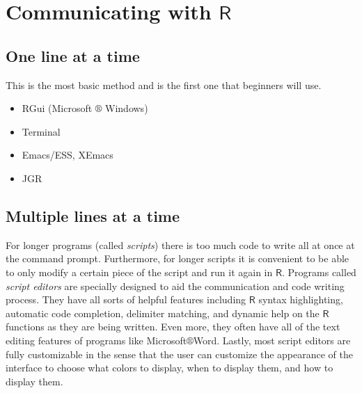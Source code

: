 \section{Communicating with \(\mathsf{R}\)}
\label{sec-2-2}

\subsection{One line at a time}
\label{sec-2-2-1}

This is the most basic method and is the first one that beginners will use.
\begin{itemize}
\item RGui (Microsoft \(\circledR\) Windows)
\item Terminal
\item Emacs/ESS, XEmacs
\item JGR
\end{itemize}

\subsection{Multiple lines at a time}
\label{sec-2-2-2}

For longer programs (called \emph{scripts}) there is too much code to write
all at once at the command prompt. Furthermore, for longer scripts it
is convenient to be able to only modify a certain piece of the script
and run it again in \(\mathsf{R}\). Programs called \emph{script editors}
are specially designed to aid the communication and code writing
process. They have all sorts of helpful features including
\(\mathsf{R}\) syntax highlighting, automatic code completion,
delimiter matching, and dynamic help on the \(\mathsf{R}\) functions
as they are being written. Even more, they often have all of the text
editing features of programs like Microsoft\(\circledR\)Word. Lastly,
most script editors are fully customizable in the sense that the user
can customize the appearance of the interface to choose what colors to
display, when to display them, and how to display them.

